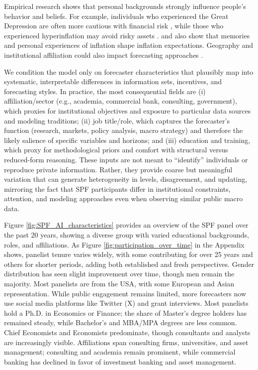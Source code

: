 \documentclass[11pt,letterpaper]{scrartcl}
\begin{document}
Empirical research shows that personal backgrounds strongly influence people's behavior and beliefs. For example, individuals who experienced the Great Depression are often more cautious with financial risk \citep{malmendier2011depression}, while those who experienced hyperinflation may avoid risky assets \citep{fajardo2018understanding}. \cite{salle2024lifetime} and \cite{malmendier2016learning} also show that memories and personal experiences of inflation shape inflation expectations. Geography and institutional affiliation could also impact forecasting approaches \citep{batchelor2007bias, hong2010competition}.

We condition the model only on forecaster characteristics that plausibly map into systematic, interpretable differences in information sets, incentives, and forecasting styles. In practice, the most consequential fields are (i) affiliation/sector (e.g., academia, commercial bank, consulting, government), which proxies for institutional objectives and exposure to particular data sources and modeling traditions; (ii) job title/role, which captures the forecaster's function (research, markets, policy analysis, macro strategy) and therefore the likely salience of specific variables and horizons; and (iii) education and training, which proxy for methodological priors and comfort with structural versus reduced-form reasoning. These inputs are not meant to ``identify'' individuals or reproduce private information. Rather, they provide coarse but meaningful variation that can generate heterogeneity in levels, disagreement, and updating, mirroring the fact that SPF participants differ in institutional constraints, attention, and modeling approaches even when observing similar public macro data.

Figure \ref{fig:SPF_AI_characteristics} provides an overview of the SPF panel over the past 20 years, showing a diverse group with varied educational backgrounds, roles, and affiliations. As Figure \ref{fig:participation_over_time} in the Appendix shows, panelist tenure varies widely, with some contributing for over 25 years and others for shorter periods, adding both established and fresh perspectives. Gender distribution has seen slight improvement over time, though men remain the majority. Most panelists are from the USA, with some European and Asian representation. While public engagement remains limited, more forecasters now use social media platforms like Twitter (X) and grant interviews. Most panelists hold a Ph.D. in Economics or Finance; the share of Master's degree holders has remained steady, while Bachelor's and MBA/MPA degrees are less common. Chief Economists and Economists predominate, though consultants and analysts are increasingly visible. Affiliations span consulting firms, universities, and asset management; consulting and academia remain prominent, while commercial banking has declined in favor of investment banking and asset management. 
\end{document}
